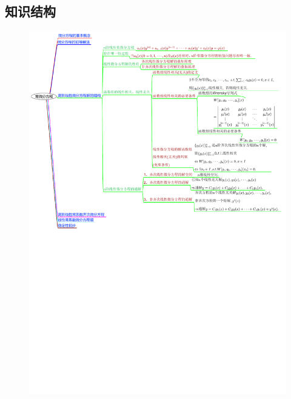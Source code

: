 \documentclass[12pt,UTF8,fleqn]{ctexart}
\begin{document}
\subsection{知识结构}
\begin{figure}[H]
\begin{center}
\includegraphics[height=1\textheight]{20190615-1.pdf}
\end{center}
\end{figure}
\end{document}
